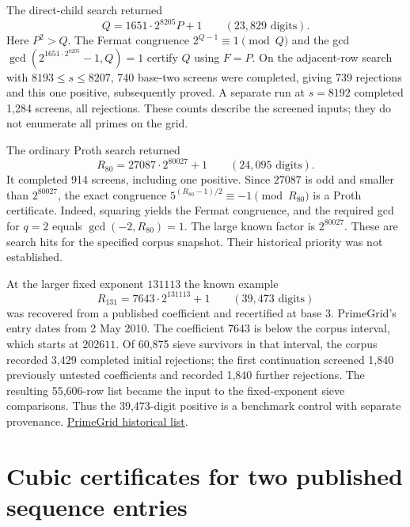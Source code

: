 \documentclass[11pt,a4paper,oneside,openany]{report}
\begin{document}
The direct-child search returned
\[
 Q=1651\cdot 2^{8205}P+1\qquad(23,829\text{ digits}).
\]
Here $P^2>Q$. The Fermat congruence $2^{Q-1}\equiv1\pmod Q$ and the gcd
$\gcd(2^{1651\cdot2^{8205}}-1,Q)=1$ certify $Q$ using $F=P$. On the adjacent-row search with $8193\le s\le8207$, 740 base-two screens were completed, giving 739 rejections and this one positive, subsequently proved. A separate run at $s=8192$ completed 1,284 screens, all rejections. These counts describe the screened inputs; they do not enumerate all primes on the grid.

The ordinary Proth search returned
\[
 R_{80}=27087\cdot2^{80027}+1\qquad(24,095\text{ digits}).
\]
It completed 914 screens, including one positive. Since $27087$ is odd and smaller than $2^{80027}$, the exact congruence $5^{(R_{80}-1)/2}\equiv-1\pmod {R_{80}}$ is a Proth certificate. Indeed, squaring yields the Fermat congruence, and the required gcd for $q=2$ equals $\gcd(-2,R_{80})=1$. The large known factor is $2^{80027}$. These are search hits for the specified corpus snapshot. Their historical priority was not established.

At the larger fixed exponent $131113$ the known example
\[
 R_{131}=7643\cdot2^{131113}+1\qquad(39,473\text{ digits})
\]
was recovered from a published coefficient and recertified at base $3$. PrimeGrid's entry dates from 2 May 2010. The coefficient $7643$ is below the corpus interval, which starts at $202611$. Of 60,875 sieve survivors in that interval, the corpus recorded 3,429 completed initial rejections; the first continuation screened 1,840 previously untested coefficients and recorded 1,840 further rejections. The resulting 55,606-row list became the input to the fixed-exponent sieve comparisons. Thus the 39,473-digit positive is a benchmark control with separate provenance. \href{https://primegrid.com/primes/?section=primelist\&userid=776}{PrimeGrid historical list}.

\section{Cubic certificates for two published sequence entries}
\end{document}
